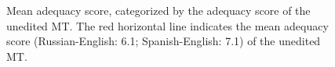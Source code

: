 \begin{figure}
\begin{subfigure}[b]{\linewidth}
\begin{center}
\end{center}
\end{subfigure}
\caption{Mean adequacy score, categorized by the adequacy score of the unedited MT. The red horizontal line indicates the mean adequacy score (Russian-English: 6.1; Spanish-English: 7.1) of the unedited MT.}
\label{fig:mean_adequacy_score}
\end{figure}

